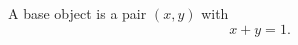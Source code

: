 
\begin{definition}\label{def:base}
A base object is a pair $(x, y)$ with
\begin{equation}\label{eq:base}
  x + y = 1 .
\end{equation}
\end{definition}
